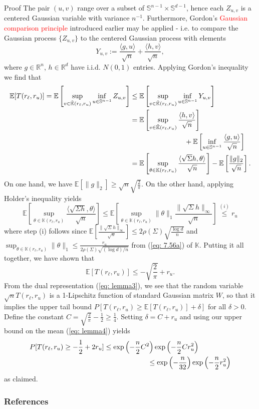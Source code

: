 \documentclass[10pt,handout,english]{beamer}
\newcommand{\E}{\mathbb{E}}
\newcommand{\R}{\mathbb{R}}
\newcommand{\K}{\mathbb{K}}
\renewcommand{\S}{\mathbb{S}}
\begin{document}
\begin{frame}[allowframebreaks]{Proof}
The pair $(u,v)$ range over a subset of $\S^{n-1}\times\S^{d-1}$, hence each $Z_{u,v}$ is a centered Gaussian variable with variance $n^{-1}$. Furthermore, Gordon's \textcolor{red}{Gaussian comparison principle} introduced earlier may be applied - i.e. to compare the Gaussian process $\{Z_{u,v}\}$ to the centered Gaussian process with elements
\[
Y_{u,v}:=\frac{\langle g,u\rangle}{\sqrt{n}}+\frac{\langle h,v\rangle}{\sqrt{n}},
\]
where $g\in\R^n$, $h\in\R^d$ have i.i.d. $N(0,1)$ entries. Applying Gordon's inequality  we find that
\begin{align*}
\E[T(r_{\ell},r_u)]=\E\left[\sup_{v\in\tilde{\K}(r_{\ell},r_u)}\inf_{u\in \S^{n-1}}Z_{u,v}\right]&\leq \E\left[\sup_{v\in\tilde{\K}(r_{\ell},r_u)}\inf_{u\in\S^{n-1}}Y_{u,v}\right]\\
&=\E\left[\sup_{v\in\tilde{\K}(r_{\ell},r_u)}\frac{\langle h,v\rangle}{\sqrt{n}}\right]\\
&\textcolor{white}{==========}+\E\left[\inf_{u\in \S^{n-1}}\frac{\langle g,u\rangle}{\sqrt{n}}\right]\\
&=\E\left[\sup_{\theta\in\K(r_{\ell},r_u)}\frac{\langle\sqrt{\Sigma}h,\theta\rangle}{\sqrt{n}}\right]-\E\left[\frac{\lVert g\rVert_2}{\sqrt{n}}\right].
\end{align*}
On one hand, we have $\E[\lVert g\rVert_2]\geq \sqrt{n}\sqrt{\frac{2}{\pi}}$. On the other hand, applying Holder's inequality yields
\[
\E\left[\sup_{\theta\in\K(r_{\ell},r_u)}\frac{\langle \sqrt{\Sigma h},\theta\rangle}{\sqrt{n}}\right]\leq \E\left[\sup_{\theta\in\K(r_{\ell},r_u)}\lVert\theta\rVert_1\frac{\lVert\sqrt{\Sigma}h\rVert_{\infty}}{\sqrt{n}}\right]\overset{(i)}{\leq} r_u
\]
where step (i) follows since $\E\left[\frac{\lVert \sqrt{\Sigma}h\rVert_{\infty}}{\sqrt{n}}\right]\leq 2\rho(\Sigma)\sqrt{\frac{\log d}{n}}$ and $\sup_{\theta\in\K(r_{\ell},r_u)}\lVert\theta\rVert_1\leq \frac{r_u}{2\rho(\Sigma)\sqrt{(\log d)/n}}$ from (\ref{eq: 7.56a}) of $\K$. Putting it all together, we have shown that
\begin{equation}\label{eq: lemma4}
\E[T(r_{\ell},r_u)]\leq-\sqrt{\frac{2}{\pi}}+r_u.
\end{equation}
From the dual representation (\ref{eq: lemma3}), we see that the random variable $\sqrt{n}T(r_{\ell},r_u)$ is a 1-Lipschitz function of standard Gaussian matrix $W$, so that it implies the upper tail bound $P[T(r_{\ell},r_u)\geq \E[T(r_{\ell},r_u)]+\delta]$ for all $\delta>0$. Define the constant $C=\sqrt{\frac{2}{\pi}}-\frac{1}{2}\geq \frac{1}{4}$. Setting $\delta=C+r_u$ and using our upper bound on the mean (\ref{eq: lemma4}) yields
\begin{align*}
P[T(r_{\ell},r_u)\geq -\frac{1}{2}+2r_u]&\leq \exp\left(-\frac{n}{2}C^2\right)\exp\left(-\frac{n}{2}Cr_u^2\right)\\
&\textcolor{white}{========}\leq \exp\left(-\frac{n}{32}\right)\exp\left(-\frac{n}{2}r_u^2\right)
\end{align*}
as claimed.
\end{frame}

\begin{frame}[allowframebreaks]
\frametitle{References}


\end{frame}
\end{document}
